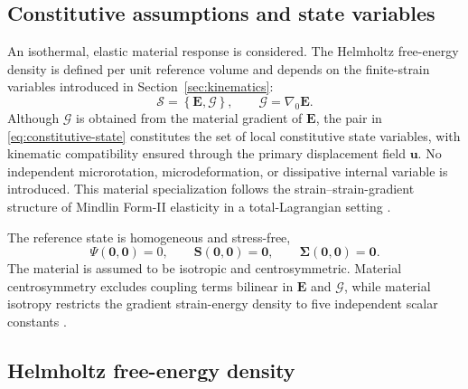 \documentclass[preprint,12pt]{elsarticle}
\begin{document}
\subsection{Constitutive assumptions and state variables}
\label{sec:constitutive-assumptions}

An isothermal, elastic material response is considered. The Helmholtz
free-energy density is defined per unit reference volume
\cite{ColemanNoll1963,Holzapfel2000} and depends on the finite-strain
variables introduced in Section~\ref{sec:kinematics}:
\begin{equation}
 \mathcal{S}=\left\{\mathbf{E},\bm{\mathcal{G}}\right\},
 \qquad
 \bm{\mathcal{G}}=\nabla_0\mathbf{E}.
 \label{eq:constitutive-state}
\end{equation}
Although $\bm{\mathcal{G}}$ is obtained from the material gradient of
$\mathbf{E}$, the pair in \eqref{eq:constitutive-state} constitutes the set of
local constitutive state variables, with kinematic compatibility ensured
through the primary displacement field $\mathbf{u}$. No independent
microrotation, microdeformation, or dissipative internal variable is
introduced. This material specialization follows the strain--strain-gradient
structure of Mindlin Form-II elasticity in a total-Lagrangian setting
\cite{Mindlin1964,MindlinEshel1968,AbaliMullerEremeyev2015}.

The reference state is homogeneous and stress-free,
\begin{equation}
 \Psi(\mathbf{0},\mathbf{0})=0,
 \qquad
 \mathbf{S}(\mathbf{0},\mathbf{0})=\mathbf{0},
 \qquad
 \boldsymbol{\Sigma}(\mathbf{0},\mathbf{0})=\mathbf{0}.
 \label{eq:constitutive-reference-state}
\end{equation}
The material is assumed to be isotropic and centrosymmetric. Material
centrosymmetry excludes coupling terms bilinear in $\mathbf{E}$ and
$\bm{\mathcal{G}}$, while material isotropy restricts the gradient
strain-energy density to five independent scalar constants
\cite{Mindlin1964,MindlinEshel1968}.

\subsection{Helmholtz free-energy density}
\label{sec:helmholtz-energy}
\end{document}
